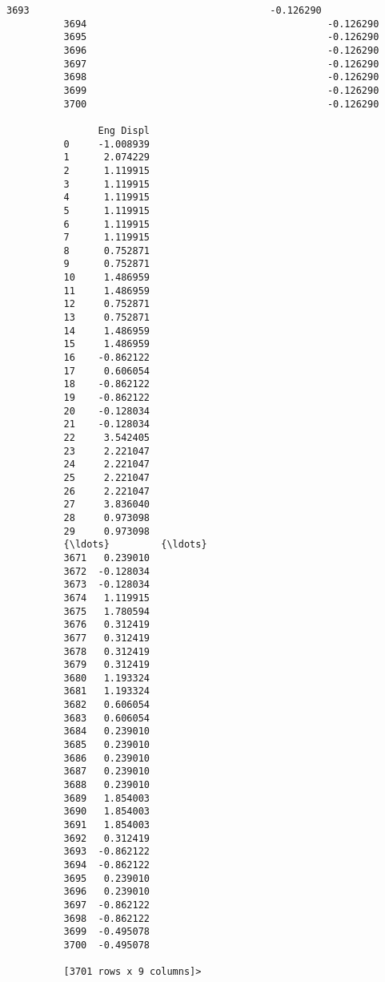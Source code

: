 \documentclass[11pt]{article}
\begin{document}
\begin{Verbatim}[commandchars=\\\{\}]
          3693                                          -0.126290                               
          3694                                          -0.126290                               
          3695                                          -0.126290                               
          3696                                          -0.126290                               
          3697                                          -0.126290                               
          3698                                          -0.126290                               
          3699                                          -0.126290                               
          3700                                          -0.126290                               
          
                Eng Displ  
          0     -1.008939  
          1      2.074229  
          2      1.119915  
          3      1.119915  
          4      1.119915  
          5      1.119915  
          6      1.119915  
          7      1.119915  
          8      0.752871  
          9      0.752871  
          10     1.486959  
          11     1.486959  
          12     0.752871  
          13     0.752871  
          14     1.486959  
          15     1.486959  
          16    -0.862122  
          17     0.606054  
          18    -0.862122  
          19    -0.862122  
          20    -0.128034  
          21    -0.128034  
          22     3.542405  
          23     2.221047  
          24     2.221047  
          25     2.221047  
          26     2.221047  
          27     3.836040  
          28     0.973098  
          29     0.973098  
          {\ldots}         {\ldots}  
          3671   0.239010  
          3672  -0.128034  
          3673  -0.128034  
          3674   1.119915  
          3675   1.780594  
          3676   0.312419  
          3677   0.312419  
          3678   0.312419  
          3679   0.312419  
          3680   1.193324  
          3681   1.193324  
          3682   0.606054  
          3683   0.606054  
          3684   0.239010  
          3685   0.239010  
          3686   0.239010  
          3687   0.239010  
          3688   0.239010  
          3689   1.854003  
          3690   1.854003  
          3691   1.854003  
          3692   0.312419  
          3693  -0.862122  
          3694  -0.862122  
          3695   0.239010  
          3696   0.239010  
          3697  -0.862122  
          3698  -0.862122  
          3699  -0.495078  
          3700  -0.495078  
          
          [3701 rows x 9 columns]>
\end{Verbatim}
        
\end{document}
